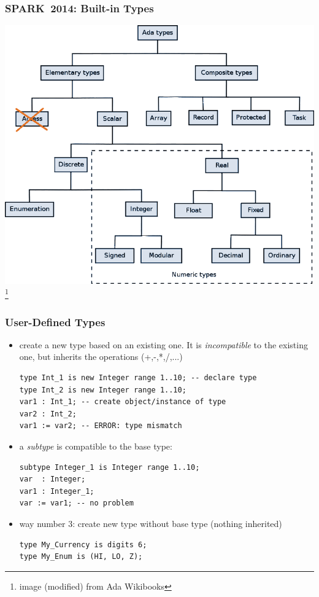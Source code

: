 \begin{frame}
  \frametitle{SPARK~2014: Built-in Types}
\includegraphics[height=.7\textwidth]{content/images/spark/types}
\footnote{\tiny image (modified) from Ada Wikibooks}
\end{frame}

\begin{frame}[fragile]
  \frametitle{User-Defined Types}
  \begin{itemize}
  \item create a new type based on an existing one. It is \emph{incompatible} to the existing one, but inherits the operations (+,-,*,/,...)
\begin{lstlisting}
type Int_1 is new Integer range 1..10; -- declare type
type Int_2 is new Integer range 1..10; 
var1 : Int_1; -- create object/instance of type
var2 : Int_2;
var1 := var2; -- ERROR: type mismatch
\end{lstlisting}

  \item a \emph{subtype} is compatible to the base type:
\begin{lstlisting}
subtype Integer_1 is Integer range 1..10;
var  : Integer; 
var1 : Integer_1;
var := var1; -- no problem
\end{lstlisting}

  \item way number 3: create new type without base type (nothing inherited)
\begin{lstlisting}
type My_Currency is digits 6;
type My_Enum is (HI, LO, Z);
\end{lstlisting}
  \end{itemize}
\end{frame}
\addtocounter{clock}{2}

